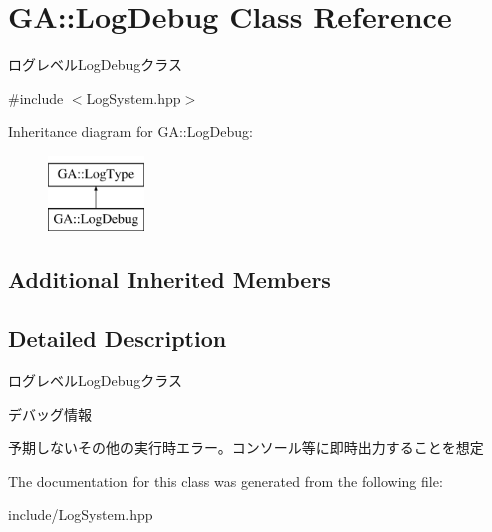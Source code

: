 \hypertarget{class_g_a_1_1_log_debug}{}\section{GA\+::Log\+Debug Class Reference}
\label{class_g_a_1_1_log_debug}


ログレベル\+Log\+Debugクラス  




{\ttfamily \#include $<$Log\+System.\+hpp$>$}

Inheritance diagram for GA\+::Log\+Debug\+:\begin{figure}[H]
\begin{center}
\leavevmode
\includegraphics[height=2.000000cm]{class_g_a_1_1_log_debug}
\end{center}
\end{figure}
\subsection*{Additional Inherited Members}


\subsection{Detailed Description}
ログレベル\+Log\+Debugクラス 

デバッグ情報

予期しないその他の実行時エラー。コンソール等に即時出力することを想定 

The documentation for this class was generated from the following file\+:\begin{DoxyCompactItemize}
\item 
include/Log\+System.\+hpp\end{DoxyCompactItemize}
